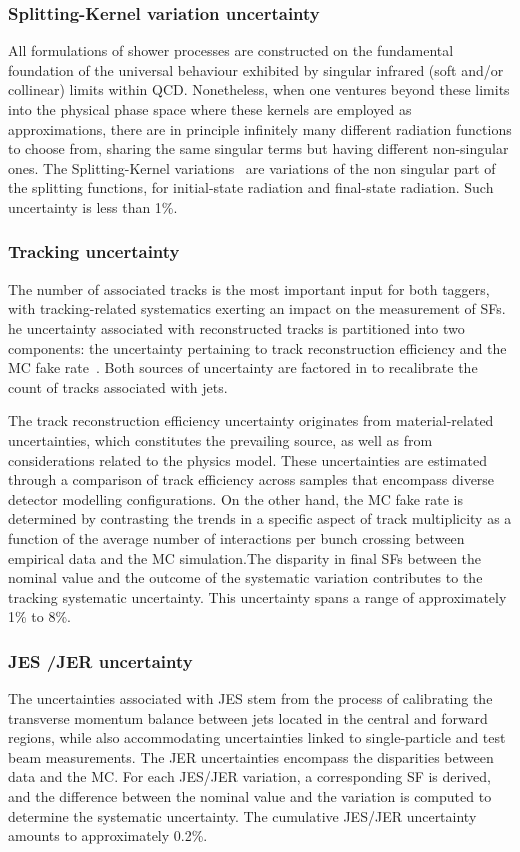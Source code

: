 \subsubsection{Splitting-Kernel variation uncertainty}
All formulations of shower processes are constructed on the fundamental foundation of the universal behaviour exhibited by singular infrared (soft and/or collinear) limits within QCD. Nonetheless, when one ventures beyond these limits into the physical phase space where these kernels are employed as approximations, there are in principle infinitely many different radiation functions to choose from, sharing the same singular terms but having different non-singular ones.  The Splitting-Kernel variations~\cite{Mrenna:2016sih} are variations of the non singular part of the splitting functions, for initial-state radiation and final-state radiation. Such uncertainty is less than 1\%.
  
    \subsubsection{Tracking uncertainty}

The number of associated tracks is the most important input for both taggers, with tracking-related systematics exerting an impact on the measurement of SFs. he uncertainty associated with reconstructed tracks is partitioned into two components: the uncertainty pertaining to track reconstruction efficiency and the MC fake rate~\cite{ATLAS:2017kyn}. Both sources of uncertainty are factored in to recalibrate the count of tracks associated with jets.

 The track reconstruction efficiency uncertainty originates from material-related uncertainties, which constitutes the prevailing source, as well as from considerations related to the physics model. These uncertainties are estimated through a comparison of track efficiency across samples that encompass diverse detector modelling configurations. On the other hand, the MC fake rate is determined by contrasting the trends in a specific aspect of track multiplicity as a function of the average number of interactions per bunch crossing between empirical data and the MC simulation.The disparity in final SFs between the nominal value and the outcome of the systematic variation contributes to the tracking systematic uncertainty. This uncertainty spans a range of approximately 1\% to 8\%.

  \subsubsection{JES /JER uncertainty }
The uncertainties associated with JES stem from the process of calibrating the transverse momentum balance between jets located in the central and forward regions, while also accommodating uncertainties linked to single-particle and test beam measurements. The JER uncertainties encompass the disparities between data and the MC. For each JES/JER variation, a corresponding SF is derived, and the difference between the nominal value and the variation is computed to determine the systematic uncertainty. The cumulative JES/JER uncertainty amounts to approximately 0.2\%.
  
